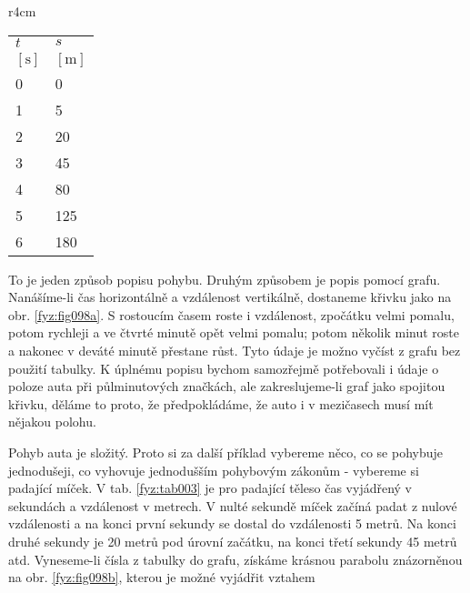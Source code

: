 {    \begin{wraptable}[14]{r}{4cm}      %
      \centering
      \begin{tabular}{>{\centering\arraybackslash}p{2em}|>{\centering\arraybackslash}p{3em}}
        \hline  \(t\)    & \(s\)          \\
        \([\text{s}]\)   & \([\text{m}]\)   \\
         \hline  \num{0} & \num{0}          \\
                 \num{1} & \num{5}          \\
                 \num{2} & \num{20}         \\
                 \num{3} & \num{45}         \\
                 \num{4} & \num{80}         \\
                 \num{5} & \num{125}        \\
                 \num{6} & \num{180}        \\
        \hline 
      \end{tabular}
      \caption{Dráha padajícího míčku (\cite[s.~110]{Feynman01})}
      \label{fyz:tab003}
    \end{wraptable}
    To je jeden způsob popisu pohybu. Druhým způsobem je popis pomocí grafu. Nanášíme-li čas 
    horizontálně a vzdálenost vertikálně, dostaneme křivku jako na obr. \ref{fyz:fig098a}. S 
    rostoucím časem roste i vzdálenost, zpočátku velmi pomalu, potom rychleji a ve čtvrté minutě 
    opět velmi pomalu; potom několik minut roste a nakonec v deváté minutě přestane růst. Tyto 
    údaje je možno vyčíst z grafu bez použití tabulky. K úplnému popisu bychom samozřejmě 
    potřebovali i údaje o poloze auta při půlminutových značkách, ale zakreslujeme-li graf jako 
    spojitou křivku, děláme to proto, že předpokládáme, že auto i v mezičasech musí mít nějakou 
    polohu.
    
    Pohyb auta je složitý. Proto si za další příklad vybereme něco, co se pohybuje jednodušeji, co 
    vyhovuje jednodušším pohybovým zákonům - vybereme si padající míček. V tab. \ref{fyz:tab003} je 
    pro padající těleso čas vyjádřený v sekundách a vzdálenost v metrech. V nulté sekundě míček 
    začíná padat z nulové vzdálenosti a na konci první sekundy se dostal do vzdálenosti \num{5} 
    metrů. Na konci druhé sekundy je \num{20} metrů pod úrovní začátku, na konci třetí sekundy 
    \num{45} metrů atd. Vyneseme-li čísla z tabulky do grafu, získáme krásnou parabolu znázorněnou 
    na obr. \ref{fyz:fig098b}, kterou je možné vyjádřit vztahem
    
}
